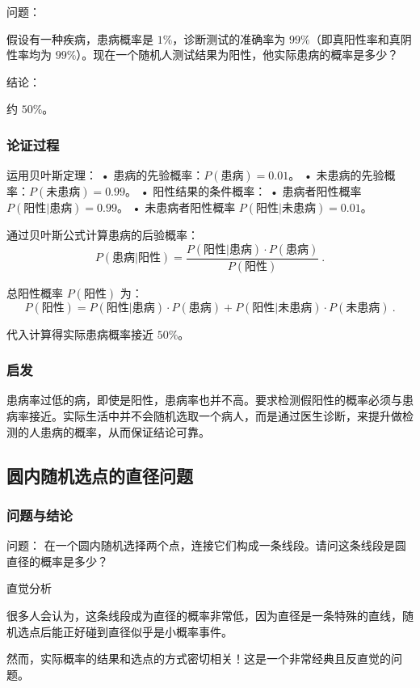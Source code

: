 问题：

假设有一种疾病，患病概率是 $1\%$，诊断测试的准确率为 $99\%$（即真阳性率和真阴性率均为 $99\%$）。现在一个随机人测试结果为阳性，他实际患病的概率是多少？

结论：

约 $50\%$。

\subsubsection{论证过程}
    
运用贝叶斯定理：
	•	患病的先验概率：$P(\text{患病}) = 0.01$。
	•	未患病的先验概率：$P(\text{未患病}) = 0.99$。
	•	阳性结果的条件概率：
	•	患病者阳性概率 $P(\text{阳性}|\text{患病}) = 0.99$。
	•	未患病者阳性概率 $P(\text{阳性}|\text{未患病}) = 0.01$。

通过贝叶斯公式计算患病的后验概率：
$$
P(\text{患病}|\text{阳性}) = \frac{P(\text{阳性}|\text{患病}) \cdot P(\text{患病})}{P(\text{阳性})}~.
$$

总阳性概率 $P(\text{阳性})$ 为：
$$
P(\text{阳性}) = P(\text{阳性}|\text{患病}) \cdot P(\text{患病}) + P(\text{阳性}|\text{未患病}) \cdot P(\text{未患病})~.
$$

代入计算得实际患病概率接近 $50\%$。

\subsubsection{启发}

患病率过低的病，即使是阳性，患病率也并不高。要求检测假阳性的概率必须与患病率接近。实际生活中并不会随机选取一个病人，而是通过医生诊断，来提升做检测的人患病的概率，从而保证结论可靠。


\subsection{圆内随机选点的直径问题}

\subsubsection{问题与结论}
问题：
在一个圆内随机选择两个点，连接它们构成一条线段。请问这条线段是圆直径的概率是多少？

直觉分析

很多人会认为，这条线段成为直径的概率非常低，因为直径是一条特殊的直线，随机选点后能正好碰到直径似乎是小概率事件。

然而，实际概率的结果和选点的方式密切相关！这是一个非常经典且反直觉的问题。


